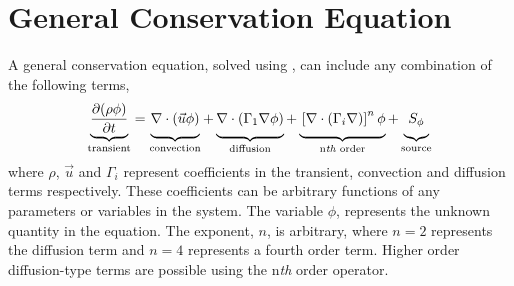 \section{General Conservation Equation}

A general conservation equation, solved using \FiPy{}, can include any
combination of the following terms,
\begin{equation}                        
  \underbrace{
  \frac{\partial (\rho \phi)}{\partial t}
  }_{\text{transient}}
=
\underbrace{
  \vphantom{\frac{\partial (\rho \phi)}{\partial t}}
  \nabla \cdot \left( \vec{u} \phi \right)
}_{\text{convection}}
+
\underbrace{
  \vphantom{\frac{\partial (\rho \phi)}{\partial t}}
  \nabla \cdot \left( \Gamma_1 \nabla \phi \right) 
}_{\text{diffusion}}
+
\underbrace{
  \vphantom{\frac{\partial (\rho \phi)}{\partial t}}
  \left[ \nabla \cdot \left( \Gamma_i \nabla \right) \right]^n \phi
}_{\text{n\textit{th} order}}
+
\underbrace{
  \vphantom{\frac{\partial (\rho \phi)}{\partial t}}
  S_{\phi}
}_{\text{source}}
\label{eqn:num:gen}
\end{equation}
where $\rho$, $\vec{u}$ and $\Gamma_i$ represent coefficients in the
transient, convection and diffusion terms respectively. These
coefficients can be arbitrary functions of any parameters or variables
in the system. The variable $\phi$, represents the unknown quantity in
the equation. The exponent, $n$, is arbitrary, where $n=2$ represents
the diffusion term and $n=4$ represents a fourth order term. Higher
order diffusion-type terms are possible using the n\textit{th} order
operator.



